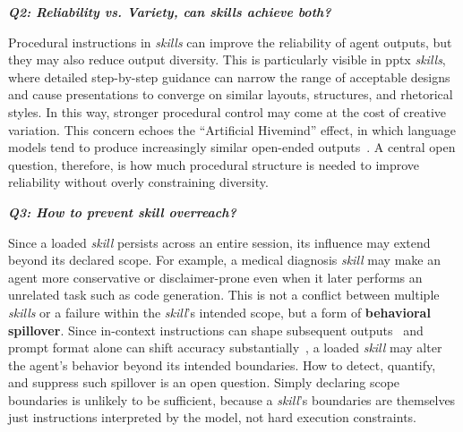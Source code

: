 \documentclass[sigconf,nonacm]{acmart}
\begin{document}



\vspace{+0.04in}
\emph{\textbf{Q2: Reliability vs. Variety, can skills achieve both?}}\label{sec:q2}

Procedural instructions in \emph{skills} can improve the reliability of agent outputs, but they may also reduce output diversity. This is particularly visible in pptx \emph{skills}, where detailed step-by-step guidance can narrow the range of acceptable designs and cause presentations to converge on similar layouts, structures, and rhetorical styles. In this way, stronger procedural control may come at the cost of creative variation. This concern echoes the “Artificial Hivemind” effect, in which language models tend to produce increasingly similar open-ended outputs~\cite{jiang2025artificial}. A central open question, therefore, is how much procedural structure is needed to improve reliability without overly constraining diversity.



\vspace{+0.04in}
\emph{\textbf{Q3: How to prevent skill overreach? }}\label{sec:q3}

Since a loaded \emph{skill} persists across an entire session, its influence may extend beyond its declared scope. For example, a medical diagnosis \emph{skill}  may make an agent more conservative or disclaimer-prone even when it later performs an unrelated task such as code generation. This is not a conflict between multiple \emph{skills} or a failure within the \emph{skill}'s intended scope, but a form of \textbf{behavioral spillover}. Since in-context instructions can shape subsequent outputs~\cite{brown2020language} and prompt format alone can shift accuracy substantially~\cite{sclar2024prompt}, a loaded \emph{skill} may alter the agent’s behavior beyond its intended boundaries. How to detect, quantify, and suppress such spillover is an open question.
Simply declaring scope boundaries is unlikely to be sufficient, because a \emph{skill}'s boundaries are themselves just instructions interpreted by the model, not hard execution constraints.
\end{document}
